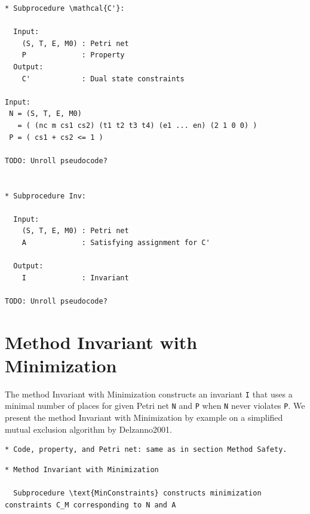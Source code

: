 \documentclass{article}
\begin{document}
\newpage
\begin{verbatim}
* Subprocedure \mathcal{C'}:

  Input:
    (S, T, E, M0) : Petri net
    P             : Property
  Output:
    C'            : Dual state constraints

Input:
 N = (S, T, E, M0)
   = ( (nc m cs1 cs2) (t1 t2 t3 t4) (e1 ... en) (2 1 0 0) )
 P = ( cs1 + cs2 <= 1 )

TODO: Unroll pseudocode?


* Subprocedure Inv:

  Input:
    (S, T, E, M0) : Petri net
    A             : Satisfying assignment for C'

  Output:
    I             : Invariant

TODO: Unroll pseudocode?
\end{verbatim}


\newpage
\section{Method Invariant with Minimization}

The method Invariant with Minimization constructs an invariant \verb=I=
that uses a minimal number of places for given Petri net \verb=N= and
\verb=P= when \verb=N= never violates \verb=P=. 
We present the method Invariant with Minimization by example on a
simplified mutual exclusion algorithm by Delzanno2001.

\begin{verbatim}
* Code, property, and Petri net: same as in section Method Safety.
\end{verbatim}

\begin{verbatim}
* Method Invariant with Minimization

  Subprocedure \text{MinConstraints} constructs minimization constraints C_M corresponding to N and A
\end{verbatim}
\end{document}
